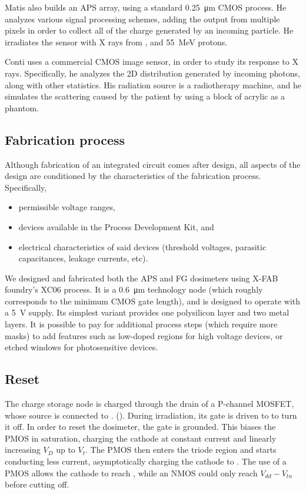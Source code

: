 Matis\cite{matis_charged_2003} also builds an APS array,
using a standard \SI{0.25}{\micro\meter} CMOS process.
He analyzes various signal processing schemes,
adding the output from multiple pixels
in order to collect all of the charge generated by an incoming particle.
He irradiates the sensor with X rays from
,
and \SI{55}{\mega\electronvolt} protons.

Conti\cite{conti_use_2013} uses a commercial CMOS image sensor,
in order to study its response to X rays.
Specifically, he analyzes the 2D distribution generated by incoming photons,
along with other statistics.
His radiation source is a radiotherapy machine,
and he simulates the scattering caused by the patient
by using a block of acrylic as a phantom.
%
\subsection{Fabrication process}
Although fabrication of an integrated circuit comes after design,
all aspects of the design are conditioned by the characteristics of the fabrication process.
Specifically,
\begin{itemize}
    \item permissible voltage ranges,
    \item devices available in the Process Development Kit, and
    \item electrical characteristics of said devices
        (threshold voltages, parasitic capacitances, leakage currents, etc).
\end{itemize}

We designed and fabricated both the APS and FG dosimeters using X-FAB foundry's
XC06 process\cite{x-fab_0.6_2008}.
It is a \SI{0.6}{\micro\meter} technology node
(which roughly corresponds to the minimum CMOS gate length),
and is designed to operate with a \SI{5}{\volt} supply.
Its simplest variant provides one polysilicon layer and two metal layers.
It is possible to pay for additional process steps (which require more masks)
to add features such as low-doped regions for high voltage devices,
or etched windows for photosensitive devices.
\subsection{Reset}
The charge storage node is charged through the drain of a P-channel MOSFET,
whose source is connected to \vdd.
().
During irradiation, its gate is driven to \vdd to turn it off.
In order to reset the dosimeter,
the gate is grounded.
This biases the PMOS in saturation,
charging the cathode at constant current and
linearly increasing $V_D$ up to $V_t$.
The PMOS then enters the triode region and starts conducting less current,
asymptotically charging the cathode to \vdd.
The use of a PMOS allows the cathode to reach \vdd,
while an NMOS could only reach $V_{dd}-V_{tn}$ before cutting off.

